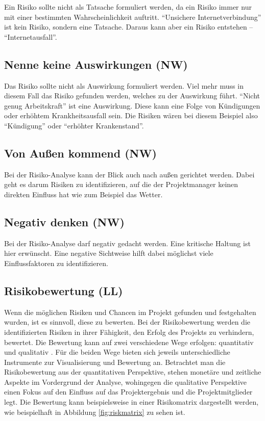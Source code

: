 \documentclass[ThesisDJ.tex]{subfiles}
\begin{document}
Ein Risiko sollte nicht als Tatsache formuliert werden, da ein Risiko immer nur mit einer bestimmten Wahrscheinlichkeit auftritt. “Unsichere Internetverbindung” ist kein Risiko, sondern eine Tatsache. Daraus kann aber ein Risiko entstehen – “Internetausfall”.

\subsection{Nenne keine Auswirkungen (NW)}

Das Risiko sollte nicht als Auswirkung formuliert werden. Viel mehr muss in diesem Fall das Risiko gefunden werden, welches zu der Auswirkung führt. “Nicht genug  Arbeitskraft” ist eine Auswirkung. Diese kann eine Folge von Kündigungen oder erhöhtem Krankheitsausfall sein. Die Risiken wären bei diesem Beispiel also “Kündigung” oder “erhöhter Krankenstand”.


\subsection{Von Außen kommend (NW)}

Bei der Risiko-Analyse kann der Blick auch nach außen gerichtet werden. Dabei geht es darum Risiken zu identifizieren, auf die der Projektmanager keinen direkten Einfluss hat wie zum Beispiel das Wetter. 

\subsection{Negativ denken (NW)}

Bei der Risiko-Analyse darf negativ gedacht werden. Eine kritische Haltung ist hier erwünscht. Eine negative Sichtweise hilft dabei möglichst viele Einflussfaktoren zu identifizieren.


\subsection{Risikobewertung (LL)}
Wenn die möglichen Risiken und Chancen im Projekt gefunden und festgehalten wurden, ist es sinnvoll, diese zu bewerten. Bei der Risikobewertung werden die identifizierten Risiken in ihrer Fähigkeit, den Erfolg des Projekts zu verhindern, bewertet. Die Bewertung kann auf zwei verschiedene Wege erfolgen: quantitativ und qualitativ \cite[S.~300 ff.]{patzak2017projektmanagement}. Für die beiden Wege bieten sich jeweils unterschiedliche Instrumente zur Visualisierung und Bewertung an. Betrachtet man die Risikobewertung aus der quantitativen Perspektive, stehen monetäre und zeitliche Aspekte im Vordergrund der Analyse, wohingegen die qualitative Perspektive einen Fokus auf den Einfluss auf das Projektergebnis und die Projektmitglieder legt. Die Bewertung kann beispielsweise in einer Risikomatrix dargestellt werden, wie beispielhaft in Abbildung \ref{fig:riskmatrix}\cite[S.~24]{cicek2022risikomanagement} zu sehen ist.
\end{document}
